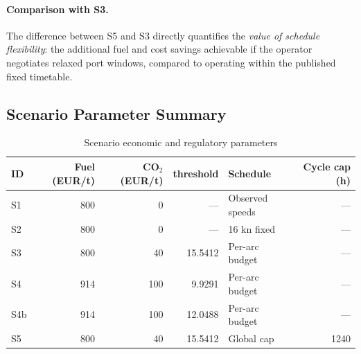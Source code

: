 \paragraph{Comparison with S3.}
The difference between S5 and S3 directly quantifies the \textit{value
of schedule flexibility}: the additional fuel and cost savings achievable
if the operator negotiates relaxed port windows, compared to operating
within the published fixed timetable.

\subsection{Scenario Parameter Summary}
\label{sec:scen:params}

\begin{table}[h]
\centering
\caption{Scenario economic and regulatory parameters}
\label{tab:scen_params}
\begin{tabular}{lrrrlr}
  \toprule
  ID & {Fuel (EUR/t)} & {CO$_2$ (EUR/t)} & {\CII{} threshold} & Schedule & {Cycle cap (h)} \\
  \midrule
  S1  & 800  & 0   & ---     & Observed speeds & --- \\
  S2  & 800  & 0   & ---     & 16 kn fixed     & --- \\
  S3  & 800  & 40  & 15.5412 & Per-arc budget  & --- \\
  S4  & 914  & 100 & 9.9291  & Per-arc budget  & --- \\
  S4b & 914  & 100 & 12.0488 & Per-arc budget  & --- \\
  S5  & 800  & 40  & 15.5412 & Global cap      & 1240 \\
  \bottomrule
\end{tabular}
\end{table}
